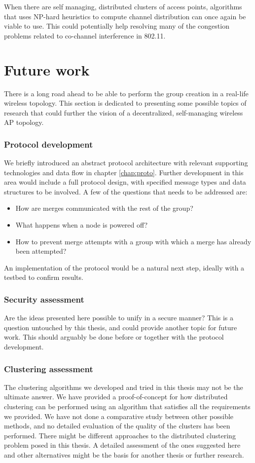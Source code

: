 When there are self managing, distributed clusters of access points, algorithms that uses NP-hard heuristics to compute channel distribution can once again be viable to use. This could
potentially help resolving many of the congestion problems related to co-channel interference in 802.11.

\section{Future work}
There is a long road ahead to be able to perform the group creation in a real-life wireless topology. This section is dedicated to presenting some possible topics of research
that could further the vision of a decentralized, self-managing wireless AP topology. 

\subsubsection{Protocol development}
We briefly introduced an abstract protocol architecture with relevant supporting technologies and data flow in chapter \ref{chap:proto}. Further development in this area would include a full protocol design, with
specified message types and data structures to be involved. A few of the questions that needs to be addressed are: 
\begin{itemize}
	\item How are merges communicated with the rest of the group?
	\item What happens when a node is powered off?
	\item How to prevent merge attempts with a group with which a merge has already been attempted?
\end{itemize}

An implementation of the protocol would be a natural next step, ideally with a testbed to confirm results. 

\subsubsection{Security assessment}
Are the ideas presented here possible to unify in a secure manner? This is a question untouched by this thesis, and could provide another topic for future work. This should arguably 
be done before or together with the protocol development. 

\subsubsection{Clustering assessment}
The clustering algorithms we developed and tried in this thesis may not be the ultimate answer. We have provided a proof-of-concept for how distributed clustering can be performed using
an algorithm that satisfies all the requirements we provided. We have not done a comparative study between other possible methods, and no detailed evaluation of the quality of the clusters has been performed. There might be different approaches to the distributed clustering problem posed in this thesis. A detailed assessment of the ones suggested here and other alternatives might be the basis for another thesis or further research.

